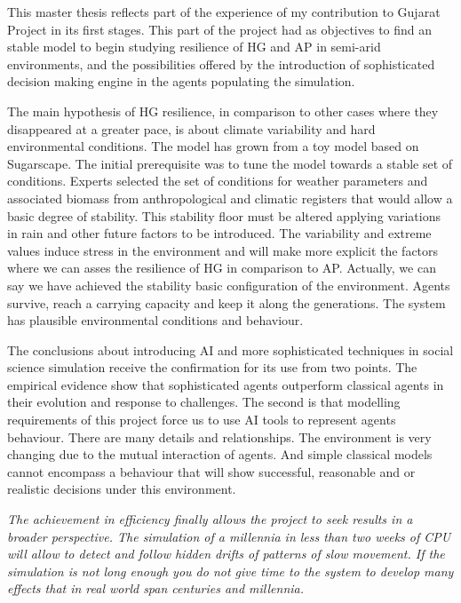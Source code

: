 \documentclass[11pt,oneside,a4paper,openright]{report}
\begin{document}
This master thesis reflects part of the experience of my contribution to Gujarat Project in
its first stages. This part of the project had as objectives to find an stable model to begin
studying resilience of HG and AP in semi-arid environments, and the possibilities offered by the
introduction of sophisticated decision making engine in the agents populating the simulation.

The main hypothesis of HG resilience, in comparison to other cases where they disappeared at a 
greater pace, is about climate variability and hard environmental conditions.
The model has grown from a toy model based on Sugarscape\cite{EpsteinAxtell}. The initial prerequisite
was to tune the model towards a stable set of conditions. Experts selected the set of conditions 
for weather parameters and associated biomass from anthropological and climatic registers that would 
allow a basic degree of stability. This stability floor must be altered applying variations in rain and
other future factors to be introduced. The variability and extreme values induce stress in the 
environment and will make more explicit the factors where we can asses the resilience of HG in comparison to AP. Actually, we can say we have achieved the stability basic configuration of the environment. Agents survive, reach a carrying capacity and keep it along the generations. The system has plausible environmental conditions and behaviour.

The conclusions about introducing AI and more sophisticated techniques in social science simulation receive
the confirmation for its use from two points. The empirical evidence show that sophisticated agents outperform classical agents in their evolution and response to challenges. 
The second is that modelling requirements of this project force us to use AI tools to represent agents behaviour. There are many details and relationships.
The environment is very changing due to the mutual interaction of agents. And simple classical models cannot encompass a behaviour that will show successful, reasonable and or realistic decisions under this environment.


\textit{The achievement in efficiency finally allows the project to seek results in a broader perspective. The simulation of a millennia in less than two weeks of CPU will allow to detect and follow hidden drifts of patterns of slow movement. 
If the simulation is not long enough you do not give time to the system to develop many effects that in real world span centuries and millennia.}
\end{document}
